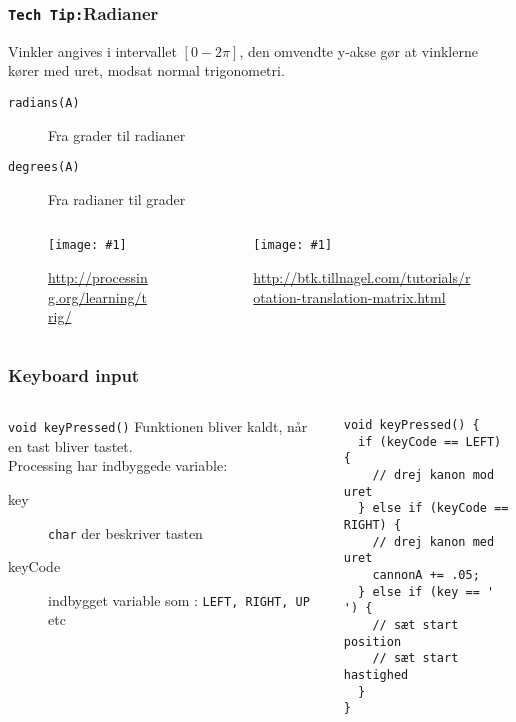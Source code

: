 \documentclass{beamer}
\newcommand{\FIGMED}[2]{
  \begin{figure}[]
    \centering
    \texttt{[image: \#1]}
    \caption{#2}
    \label{fig:#1}
  \end{figure}
}
\begin{document}
\begin{frame}[fragile]
  \frametitle{\texttt{Tech Tip:}Radianer}

  Vinkler angives i intervallet $[0 - 2\pi]$, den omvendte y-akse gør at vinklerne kører med uret, modsat normal trigonometri.
  \begin{description}
  \item[\texttt{radians(A)}] Fra grader til radianer
  \item[\texttt{degrees(A)}] Fra radianer til grader
  \end{description}
  \begin{columns}
    \begin{column}{0.5\textwidth}
      \FIGMED{unit_circle}{\url{http://processing.org/learning/trig/}}
    \end{column}
    \begin{column}{0.5\textwidth}
      \FIGMED{unitCircleDegrees.png}{\url{http://btk.tillnagel.com/tutorials/rotation-translation-matrix.html}}
    \end{column}
  \end{columns}
\end{frame}

\begin{frame}[fragile]
  \frametitle{Keyboard input}
  \begin{columns}
    \begin{column}{0.5\textwidth}
      \begin{block}{\texttt{void keyPressed()}}
        Funktionen bliver kaldt, når en tast bliver tastet.\\

        Processing har indbyggede variable:
        \begin{description}
        \item[key] \texttt{char} der beskriver tasten
        \item[keyCode] indbygget variable som : \texttt{LEFT, RIGHT, UP} etc
        \end{description}
      \end{block}
    \end{column}
    \begin{column}{0.5\textwidth}
\begin{verbatim} 
void keyPressed() {
  if (keyCode == LEFT) {
    // drej kanon mod uret
  } else if (keyCode == RIGHT) {
    // drej kanon med uret
    cannonA += .05;
  } else if (key == ' ') {
    // sæt start position
    // sæt start hastighed
  } 
}
\end{verbatim}
    \end{column}
  \end{columns}
\end{frame}
\end{document}
